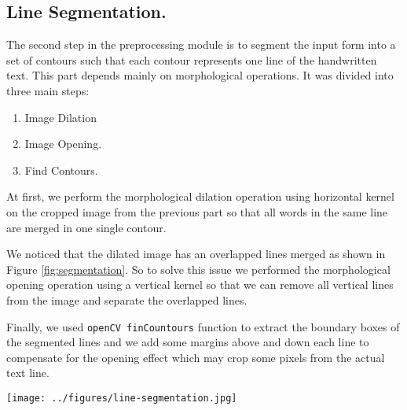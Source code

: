 \subsection{Line Segmentation.}
The second step in the preprocessing module is to segment the input form into a set of contours such that each contour represents one line of the handwritten text. This part depends mainly on morphological operations. It was divided into three main steps: 
\begin{enumerate}
  \item Image Dilation
  \item Image Opening.
  \item Find Contours.
\end{enumerate}

At first, we perform the morphological dilation operation using horizontal kernel on the cropped image from the previous part so that all words in the same line are merged in one single contour. 

We noticed that the dilated image has an overlapped lines merged as shown in Figure \ref{fig:segmentation}. So to solve this issue we performed the morphological opening operation using a vertical kernel so that we can remove all vertical lines from the image and separate the overlapped lines. 

Finally, we used  \texttt{openCV finCountours} function to extract the boundary boxes of the segmented lines and we add some margins above and down each line to compensate for the opening effect which may crop some pixels from the actual text line. 

\begin{figure*}[h]
    \centering
    \texttt{[image: ../figures/line-segmentation.jpg]}
    \label{fig:segmentation}
\end{figure*}